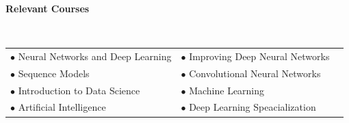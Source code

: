 \documentclass[a4paper,10pt]{article}
\begin{document}
\colorbox{titleColor}{\parbox{6.7in}{\textbf{Relevant Courses}}}\\[0.08in]
\begin{tabular}{p{3.5in}p{3in}p{2.5in}}
\hspace{0.9pc}$\bullet$ Neural Networks and Deep Learning &$\bullet$ Improving Deep Neural Networks\\[0.05in]
\hspace{0.9pc}$\bullet$ Sequence Models &$\bullet$ Convolutional Neural Networks\\[0.05in]
\hspace{0.9pc}$\bullet$ Introduction to Data Science&$\bullet$ Machine Learning \\[0.05in]
\hspace{0.9pc}$\bullet$ Artificial Intelligence&$\bullet$ Deep Learning Speacialization \\[0.05in]
\end{tabular}
\\\\

\end{document}
